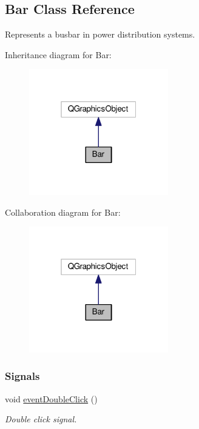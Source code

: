 \hypertarget{class_bar}{}\subsection{Bar Class Reference}
\label{class_bar}


Represents a busbar in power distribution systems.  




Inheritance diagram for Bar\+:
\nopagebreak
\begin{figure}[H]
\begin{center}
\leavevmode
\includegraphics[width=172pt]{class_bar__inherit__graph}
\end{center}
\end{figure}


Collaboration diagram for Bar\+:
\nopagebreak
\begin{figure}[H]
\begin{center}
\leavevmode
\includegraphics[width=172pt]{class_bar__coll__graph}
\end{center}
\end{figure}
\subsubsection*{Signals}
\begin{DoxyCompactItemize}
\item 
void \hyperlink{class_bar_a66bcbd19582dddee7e171ae5a4475f4b}{event\+Double\+Click} ()
\begin{DoxyCompactList}\small\item\em Double click signal. \end{DoxyCompactList}\end{DoxyCompactItemize}
